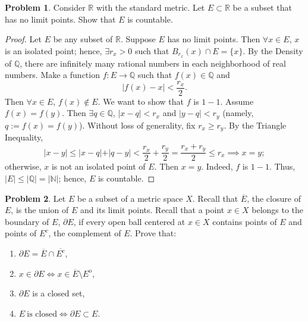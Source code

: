 \documentclass{amsart}
\theoremstyle{definition}
\newtheorem{problem}{Problem}
\begin{document}
\begin{problem}
     Consider $\mathbb{R}$ with the standard metric. Let $E \subset \mathbb{R}$ be a subset that has no limit points. Show that $E$ is countable.
\end{problem}

\begin{proof}
    Let $E$ be any subset of $\mathbb{R}$. Suppose $E$ has no limit points.
    Then $\forall x \in E$, $x$ is an isolated point; hence, $\exists r_x > 0$ such that $B_{r_x}(x) \cap E = \{x\}$. By the Density of $\mathbb{Q}$, there are infinitely many rational numbers in each neighborhood of real numbers. Make a function $f: E \to \mathbb{Q}$ such that $f(x) \in \mathbb{Q}$ and
    \[
    \vert f(x) - x \vert < \frac{r_x}{2}.
    \]
    Then $\forall x \in E$, $f(x) \notin E$. We want to show that $f$ is $1-1$. Assume $f(x) = f(y)$. Then $\exists q \in \mathbb{Q}$, $\vert x - q \vert < r_x$ and $\vert y - q \vert < r_y$ (namely, $q := f(x) = f(y)$). Without loss of generality, fix $r_x \geq r_y$. By the Triangle Inequality, 
    \[
    \vert x - y \vert \leq \vert x - q \vert + \vert q - y \vert < \frac{r_x}{2} + \frac{r_y}{2} = \frac{r_x + r_y}{2} \leq r_x \implies x = y; 
    \]
    otherwise, $x$ is not an isolated point of $E$. Then $x = y$. Indeed, $f$ is $1-1$. Thus, $\vert E \vert \leq \vert \mathbb{Q} \vert = \vert \mathbb{N} \vert$; hence, $E$ is countable. 
\end{proof}

\begin{problem}
     Let $E$ be a subset of a metric space $X$. Recall that $\overline{E}$, the closure of $E$, is the union of $E$ and its limit points. Recall that a point $x \in X$ belongs to the boundary of $E$, $\partial E$, if every open ball centered at $x \in X$ contains points of $E$ and points of $E^c$, the complement of $E$. Prove that:
     \begin{enumerate}[label = (\alph*)]
         \item $\partial E = \overline{E} \cap \overline{E^c}$,
         \item $x \in \partial E \iff x \in \overline{E} \setminus E^{\mathrm{o}}$,
         \item $\partial E$ is a closed set,
         \item $E \ \text{is closed} \iff \partial E \subset E$.
    \end{enumerate}
\end{problem}
\end{document}
